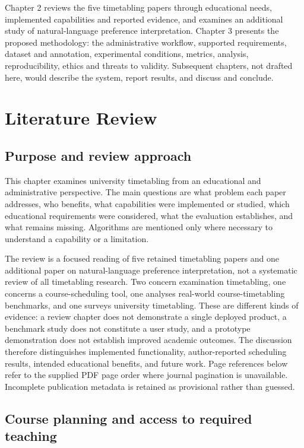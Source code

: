 \documentclass[
  11pt,a4paper,oneside]{report}
\begin{document}
Chapter 2 reviews the five timetabling papers through educational needs, implemented capabilities and reported evidence, and examines an additional study of natural-language preference interpretation. Chapter 3 presents the
proposed methodology: the administrative workflow, supported requirements,
dataset and annotation, experimental conditions, metrics, analysis,
reproducibility, ethics and threats to validity. Subsequent chapters,
not drafted here, would describe the system, report results, and discuss
and conclude.

\chapter{Literature Review}\label{literature-review}

\section{Purpose and review approach}
This chapter examines university timetabling from an educational and administrative perspective. The main questions are what problem each paper addresses, who benefits, what capabilities were implemented or studied, which educational requirements were considered, what the evaluation establishes, and what remains missing. Algorithms are mentioned only where necessary to understand a capability or a limitation.

The review is a focused reading of five retained timetabling papers and one additional paper on natural-language preference interpretation, not a systematic review of all timetabling research. Two concern examination timetabling, one concerns a course-scheduling tool, one analyses real-world course-timetabling benchmarks, and one surveys university timetabling. These are different kinds of evidence: a review chapter does not demonstrate a single deployed product, a benchmark study does not constitute a user study, and a prototype demonstration does not establish improved academic outcomes. The discussion therefore distinguishes implemented functionality, author-reported scheduling results, intended educational benefits, and future work. Page references below refer to the supplied PDF page order where journal pagination is unavailable. Incomplete publication metadata is retained as provisional rather than guessed.

\section{Course planning and access to required teaching}
\end{document}
